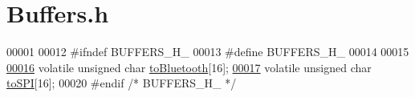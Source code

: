 \hypertarget{_buffers_8h_source}{}\section{Buffers.\+h}
\label{_buffers_8h_source}

\begin{DoxyCode}
00001 
00012 \textcolor{preprocessor}{#ifndef BUFFERS\_H\_}
00013 \textcolor{preprocessor}{#define BUFFERS\_H\_}
00014 
00015 
\hypertarget{_buffers_8h_source.tex_l00016}{}\hyperlink{_buffers_8h_af10085b37b41fff01ad209e47f7d4e44}{00016} \textcolor{keyword}{volatile} \textcolor{keywordtype}{unsigned} \textcolor{keywordtype}{char} \hyperlink{_buffers_8h_af10085b37b41fff01ad209e47f7d4e44}{toBluetooth}[16]; 
\hypertarget{_buffers_8h_source.tex_l00017}{}\hyperlink{_buffers_8h_a3b60028d98e73923081cbf257a237731}{00017} \textcolor{keyword}{volatile} \textcolor{keywordtype}{unsigned} \textcolor{keywordtype}{char} \hyperlink{_buffers_8h_a3b60028d98e73923081cbf257a237731}{toSPI}[16]; 
00020 \textcolor{preprocessor}{#endif }\textcolor{comment}{/* BUFFERS\_H\_ */}\textcolor{preprocessor}{}
\end{DoxyCode}

